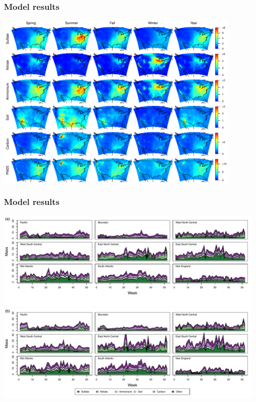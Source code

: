 \documentclass[t]{beamer}\usepackage[]{graphicx}\usepackage[]{color}
\begin{document}
\begin{frame}
\frametitle{Model results}

\vfill
\begin{center}
\vspace{-5mm}\includegraphics[width=0.9\textwidth]{figs/pm_maps.pdf}
\end{center}
\vfill

\end{frame}



\begin{frame}
\frametitle{Model results}

\vfill
\begin{center}
\includegraphics[width=\textwidth]{figs/pm_ts.pdf}\\
\includegraphics[width=\textwidth]{figs/pm_ts_legend.pdf}
\end{center}
\vfill

\end{frame}
\end{document}
